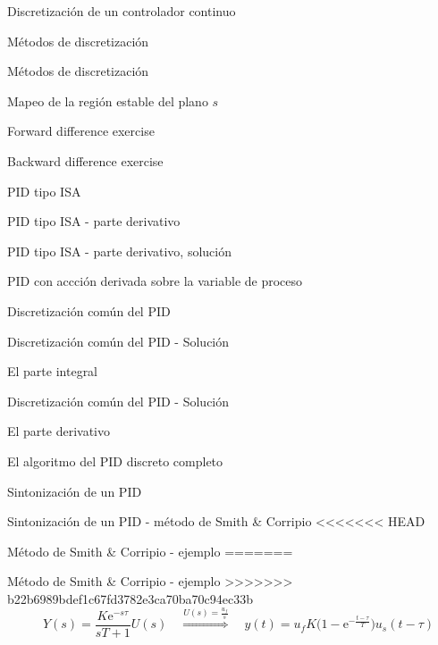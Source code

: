 \documentclass[presentation,aspectratio=1610]{beamer}
\begin{document}
\begin{frame}[label={sec:org86d23da}]{Discretización de un controlador continuo}
\begin{frame}[label={sec:org3ca2082}]{Métodos de discretización}
\begin{frame}[label={sec:orga78cff2}]{Métodos de discretización}
\begin{frame}[label={sec:org28bff53}]{Mapeo de la región estable del plano \(s\)}
\begin{frame}[label={sec:org9bb57fa}]{Forward difference exercise}
\begin{frame}[label={sec:orgaf8c1b0}]{Backward difference exercise}
\begin{frame}[label={sec:orgb2215e6}]{PID tipo ISA}
\begin{frame}[label={sec:orga06296a}]{PID tipo ISA - parte derivativo}
\begin{frame}[label={sec:org978e098}]{PID tipo ISA - parte derivativo, solución}
\begin{frame}[label={sec:orgf3b475b}]{PID con accción derivada sobre la variable de proceso}
\begin{frame}[label={sec:org5c3258e}]{Discretización común del PID}
\begin{frame}[label={sec:org95130b5}]{Discretización común del PID - Solución}
\begin{block}{El parte integral}
\begin{frame}[label={sec:org35f72c2}]{Discretización común del PID - Solución}
\begin{block}{El parte derivativo}
\begin{frame}[label={sec:org34749bc}]{El algoritmo del PID discreto completo}
\begin{frame}[label={sec:orgaefa60b}]{Sintonización de un PID}
\begin{frame}[label={sec:orge6db74e}]{Sintonización de un PID - método de Smith \& Corripio}
<<<<<<< HEAD
\begin{frame}[label={sec:org7d7b902}]{Método de Smith \& Corripio - ejemplo}
=======
\begin{frame}[label={sec:org0f77e26}]{Método de Smith \& Corripio - ejemplo}
>>>>>>> b22b6989bdef1c67fd3782e3ca70ba70c94ec33b
\[  \quad Y(s) = \frac{K\mathrm{e}^{-s\tau}}{sT + 1}U(s) \quad \overset{U(s) = \frac{u_f}{s}}{\Longrightarrow} \quad y(t) = u_f K\big( 1 - \mathrm{e}^{-\frac{t-\tau}{T}}\big)u_s(t-\tau)\]
\def\Tcnst{2.1}
\def\tdelay{1}
\def\ggain{2}
\def\uampl{0.8}
\pgfmathsetmacro{\yfinal}{\uampl*\ggain}
\pgfmathsetmacro{\tone}{\tdelay + \Tcnst/3}
\pgfmathsetmacro{\two}{\tdelay + \Tcnst}

\begin{center}
\end{center}
\end{frame}
\end{frame}
\end{frame}
\end{frame}
\end{frame}
\end{block}
\end{frame}
\end{block}
\end{frame}
\end{frame}
\end{frame}
\end{frame}
\end{frame}
\end{frame}
\end{frame}
\end{frame}
\end{frame}
\end{frame}
\end{frame}
\end{frame}
\end{document}
